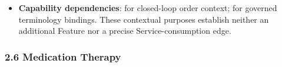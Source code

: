 \begin{itemize}
\begin{itemize}
\begin{itemize}
\item
\emph{Function}: \texttt{} — Normalises and distributes structured diagnostic observations, reference ranges, and diagnostic image study links into the LHR.



\item
\emph{Exposed Service}: \texttt{} — Publishes verified diagnostic reports across the enterprise.



\end{itemize}


\end{itemize}


\item
\textbf{Capability dependencies}: \texttt{} for closed-loop order context; \texttt{} for governed terminology bindings. These contextual purposes establish neither an additional Feature nor a precise Service-consumption edge.



\end{itemize}
\label{rad:sd:142}

\par\smallskip
{}\label{rad:sd:144}



\label{rad:sd:146}
\subsubsection*{2.6 Medication Therapy}
\label{rad:sd:147}

